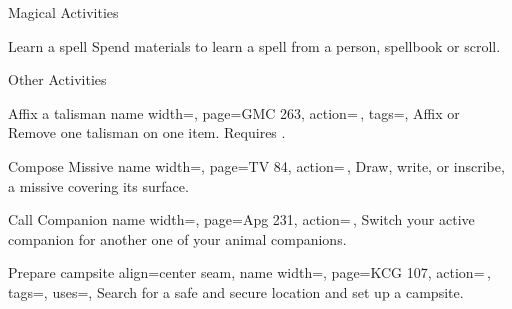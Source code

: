 \begin{PageFrontLandscape}
\begin{TablesHalf}{\frontTableHeight}
\begin{Table}{Magical Activities}
\begin{entry}{Learn a spell}
{            }
                Spend materials to learn a spell from a person, spellbook or scroll. \hfill
                \\
                \hphantom{t}\hfill{}\quad
            \end{entry}
        \end{Table}
        \TableSpace
        \begin{Table}{Other Activities}
            \begin{entry}{Affix a talisman}{%
                name width=\activityLength,%
                page=GMC 263,
                action=\,,
                tags=\Manipulate,
            }
                Affix or Remove one talisman on one item. Requires .\hfill
            \end{entry}
            \begin{entry}{Compose Missive}{%
                name width=\activityLength,%
                page=TV 84,
                action=\,,
            }
                Draw, write, or inscribe, a missive covering its surface.\hfill
            \end{entry}
            \begin{entry}{Call Companion}{%
                name width=\activityLength,%
                page=Apg 231,
                action=\,,
            }
                Switch your active companion for another one of your animal companions.
            \end{entry}
            \begin{entry}{Prepare campsite}{%
                align=center seam,
                name width=\activityLength,%
                page=KCG 107,
                action=\,,
                tags=\Concentrate\Move,
                uses=\Survival,
            }
                Search for a safe and secure location and set up a campsite.\hfill
                \\
                \hfill
                \hfill
            \end{entry}
        \end{Table}

\end{TablesHalf}
\end{PageFrontLandscape}
